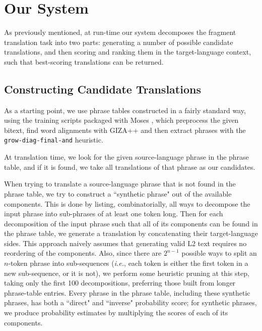 \documentclass[11pt]{article}
\begin{document}

\section{Our  System}
\label{sec:system}

As previously mentioned, at run-time our system decomposes the fragment
translation task into two parts: generating a number of possible candidate
translations, and then scoring and ranking them in the target-language context,
such that best-scoring translations can be returned.

\subsection{Constructing Candidate Translations}
\label{sec:candidates}

As a starting point, we use phrase tables constructed in a fairly standard way,
using the training scripts packaged with Moses \cite{koehn:hoang:ea:07}, which
preprocess the given bitext, find word alignments with GIZA++ \cite{och:ney:00}
and then extract phrases with the \texttt{grow-diag-final-and} heuristic. 

At translation time, we look for the given source-language phrase in the phrase
table, and if it is found, we take all translations of that phrase as our
candidates.

When trying to translate a source-language phrase that is not found in the
phrase table, we try to construct a ``synthetic phrase" out of the available
components. This is done by listing, combinatorially, all ways to decompose the
input phrase into sub-phrases of at least one token long. Then for each
decomposition of the input phrase such that all of its components can be found
in the phrase table, we generate a translation by concatenating their
target-language sides. This approach naively assumes that generating valid L2
text requires no reordering of the components. Also, since there are $2^{n-1}$
possible ways to split an $n$-token phrase into sub-sequences (\textit{i.e.},
each token is either the first token in a new sub-sequence, or it is not), we
perform some heuristic pruning at this step, taking only the first 100
decompositions, preferring those built from longer phrase-table entries. Every
phrase in the phrase table, including these synthetic phrases, has both a
``direct" and ``inverse" probability score; for synthetic phrases, we produce
probability estimates by multiplying the scores of each of its components.
\end{document}
